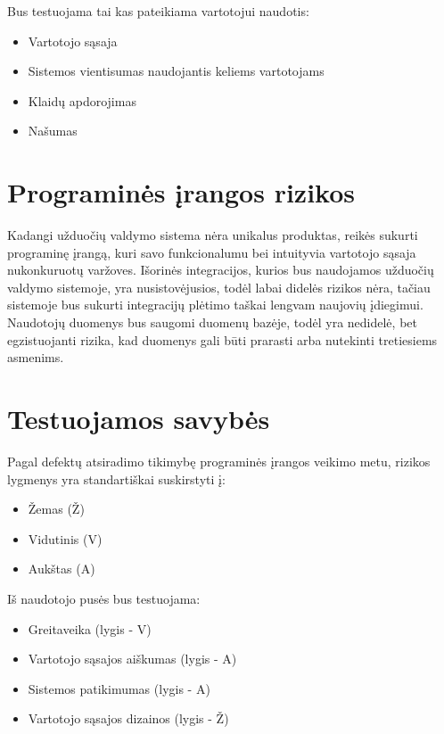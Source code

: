 \documentclass{VUMIFPSkursinis}
\begin{document}
    Bus testuojama tai kas pateikiama vartotojui naudotis:
    
    \begin{itemize}
    	\item Vartotojo sąsaja
    	\item Sistemos vientisumas naudojantis keliems vartotojams
    	\item Klaidų apdorojimas
    	\item Našumas
    \end{itemize}


    \section{Programinės įrangos rizikos}

    Kadangi užduočių valdymo sistema nėra unikalus produktas, reikės sukurti programinę įrangą,
     kuri savo funkcionalumu bei intuityvia vartotojo sąsaja nukonkuruotų varžoves.
    Išorinės integracijos, kurios bus naudojamos užduočių valdymo sistemoje, yra nusistovėjusios, todėl labai didelės
     rizikos nėra, tačiau sistemoje bus sukurti integracijų plėtimo taškai lengvam naujovių įdiegimui.
    Naudotojų duomenys bus saugomi duomenų bazėje, todėl yra nedidelė, bet egzistuojanti rizika, kad duomenys gali būti
     prarasti arba nutekinti tretiesiems asmenims.


    \section{Testuojamos savybės}

    Pagal defektų atsiradimo tikimybę programinės įrangos veikimo metu, rizikos lygmenys yra standartiškai suskirstyti į:

    \begin{itemize}
    	\item Žemas (Ž)
    	\item Vidutinis (V)
    	\item Aukštas (A)
    \end{itemize}

    Iš naudotojo pusės bus testuojama:

    \begin{itemize}
    	\item Greitaveika (lygis - V)
    	\item Vartotojo sąsajos aiškumas (lygis - A)
    	\item Sistemos patikimumas (lygis - A)
    	\item Vartotojo sąsajos dizainos (lygis - Ž)
    \end{itemize}
\end{document}
